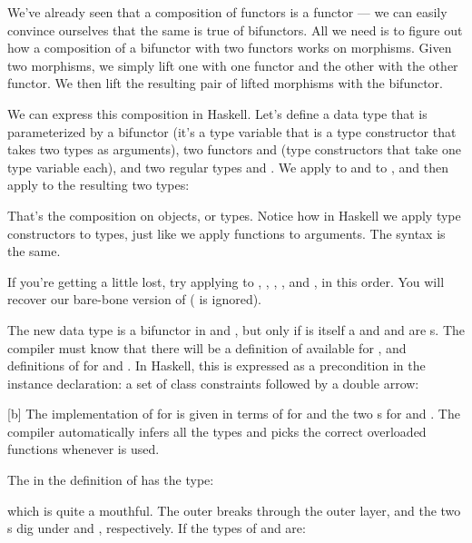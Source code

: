 We've already seen that a composition of functors is a functor --- we
can easily convince ourselves that the same is true of bifunctors. All
we need is to figure out how a composition of a bifunctor with two
functors works on morphisms. Given two morphisms, we simply lift one
with one functor and the other with the other functor. We then lift the
resulting pair of lifted morphisms with the bifunctor.

We can express this composition in Haskell. Let's define a data type
that is parameterized by a bifunctor  (it's a type variable
that is a type constructor that takes two types as arguments), two
functors  and  (type constructors that take one
type variable each), and two regular types  and . We
apply  to  and  to , and then
apply  to the resulting two types:

That's the composition on objects, or types. Notice how in Haskell we
apply type constructors to types, just like we apply functions to
arguments. The syntax is the same.

If you're getting a little lost, try applying  to
, , , , and
, in this order. You will recover our bare-bone version of
 ( is ignored).

The new data type  is a bifunctor in  and
, but only if  is itself a  and
 and  are s. The compiler must
know that there will be a definition of  available for
, and definitions of  for  and
. In Haskell, this is expressed as a precondition in the
instance declaration: a set of class constraints followed by a double
arrow:

[b]
The implementation of  for  is given in
terms of  for  and the two s for
 and . The compiler automatically infers all the
types and picks the correct overloaded functions whenever
 is used.

The  in the definition of  has the type:

which is quite a mouthful. The outer  breaks through the
outer  layer, and the two s dig under
 and , respectively. If the types of 
and  are:

